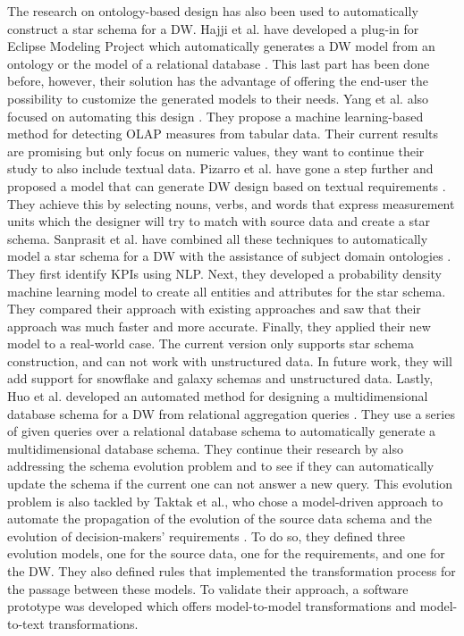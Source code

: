\documentclass[11pt]{article}
\begin{document}
The research on ontology-based design has also been used to automatically construct a star schema for a DW. Hajji et al. have developed a plug-in for Eclipse Modeling Project which automatically generates a DW model from an ontology or the model of a relational database \cite{Hajji2020613}. This last part has been done before, however, their solution has the advantage of offering the end-user the possibility to customize the generated models to their needs. Yang et al. also focused on automating this design \cite{Yang2022173}. They propose a machine learning-based method for detecting OLAP measures from tabular data. Their current results are promising but only focus on numeric values, they want to continue their study to also include textual data. Pizarro et al. have gone a step further and proposed a model that can generate DW design based on textual requirements \cite{Pizarro202213}. They achieve this by selecting nouns, verbs, and words that express measurement units which the designer will try to match with source data and create a star schema. Sanprasit et al. have combined all these techniques to automatically model a star schema for a DW with the assistance of subject domain ontologies \cite{Sanprasit2021, Sanprasit2021518}. They first identify KPIs using NLP. Next, they developed a probability density machine learning model to create all entities and attributes for the star schema. They compared their approach with existing approaches and saw that their approach was much faster and more accurate. Finally, they applied their new model to a real-world case. The current version only supports star schema construction, and can not work with unstructured data. In future work, they will add support for snowflake and galaxy schemas and unstructured data. Lastly, Huo et al. developed an automated method for designing a multidimensional database schema for a DW from relational aggregation queries \cite{Huo2020337}. They use a series of given queries over a relational database schema to automatically generate a multidimensional database schema. They continue their research by also addressing the schema evolution problem and to see if they can automatically update the schema if the current one can not answer a new query. This evolution problem is also tackled by Taktak et al., who chose a model-driven approach to automate the propagation of the evolution of the source data schema and the evolution of decision-makers' requirements \cite{Taktak2018401}. To do so, they defined three evolution models, one for the source data, one for the requirements, and one for the DW. They also defined rules that implemented the transformation process for the passage between these models. To validate their approach, a software prototype was developed which offers model-to-model transformations and model-to-text transformations. \\
\end{document}
